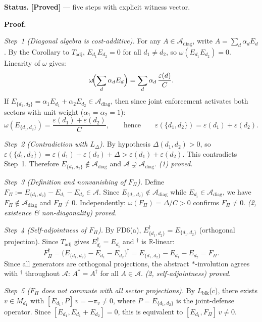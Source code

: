 \documentclass[11pt]{article}
\theoremstyle{remark}
\begin{document}
\begin{tcolorbox}[apfbox, title={Corollary of $L_\Pi$ (Joint Enforcement is Not Diagonal)}]
\smallskip\noindent\textbf{Status.}  \textbf{[Proved]} --- five steps with explicit witness vector.

\smallskip\noindent\textbf{Proof.}

\textit{Step~1 (Diagonal algebra is cost-additive).}
For any $A \in \mathcal{A}_{\mathrm{diag}}$, write $A = \sum_d \alpha_d E_d$.  By the Corollary to $T_{\mathrm{adj}}$, $E_{d_1} E_{d_2} = 0$ for all $d_1 \ne d_2$, so $\omega(E_{d_1} E_{d_2}) = 0$.  Linearity of $\omega$ gives:
\[
\omega\!\Bigl(\sum_d \alpha_d E_d\Bigr) = \sum_d \alpha_d\,\frac{\varepsilon(d)}{C}.
\]
If $E_{\{d_1,d_2\}} = \alpha_1 E_{d_1} + \alpha_2 E_{d_2} \in \mathcal{A}_{\mathrm{diag}}$, then since joint enforcement activates both sectors with unit weight ($\alpha_1 = \alpha_2 = 1$):
\[
\omega(E_{\{d_1,d_2\}}) = \frac{\varepsilon(d_1)+\varepsilon(d_2)}{C},
\qquad\text{hence}\qquad
\varepsilon(\{d_1,d_2\}) = \varepsilon(d_1)+\varepsilon(d_2).
\]

\textit{Step~2 (Contradiction with $L_\Delta$).}
By hypothesis $\Delta(d_1,d_2) > 0$, so $\varepsilon(\{d_1,d_2\}) = \varepsilon(d_1)+\varepsilon(d_2)+\Delta > \varepsilon(d_1)+\varepsilon(d_2)$. This contradicts Step~1.  Therefore $E_{\{d_1,d_2\}} \notin \mathcal{A}_{\mathrm{diag}}$ and $\mathcal{A} \supsetneq \mathcal{A}_{\mathrm{diag}}$. \hfill\textit{(1) proved.}

\textit{Step~3 (Definition and nonvanishing of $F_\Pi$).}
Define $F_\Pi := E_{\{d_1,d_2\}} - E_{d_1} - E_{d_2} \in \mathcal{A}$.
Since $E_{\{d_1,d_2\}} \notin \mathcal{A}_{\mathrm{diag}}$ while $E_{d_i} \in \mathcal{A}_{\mathrm{diag}}$, we have $F_\Pi \notin \mathcal{A}_{\mathrm{diag}}$ and $F_\Pi \ne 0$.  Independently: $\omega(F_\Pi) = \Delta/C > 0$ confirms $F_\Pi \ne 0$. \hfill\textit{(2, existence \& non-diagonality) proved.}

\textit{Step~4 (Self-adjointness of $F_\Pi$).}
By FD6(a), $E_{\{d_1,d_2\}}^\dagger = E_{\{d_1,d_2\}}$ (orthogonal projection).
Since $T_{\mathrm{adj}}$ gives $E_{d_i}^\dagger = E_{d_i}$ and ${}^\dagger$ is $\mathbb{R}$-linear:
\[
F_\Pi^\dagger = \bigl(E_{\{d_1,d_2\}} - E_{d_1} - E_{d_2}\bigr)^\dagger
= E_{\{d_1,d_2\}} - E_{d_1} - E_{d_2} = F_\Pi.
\]
Since all generators are orthogonal projections, the abstract $*$-involution agrees with ${}^\dagger$ throughout $\mathcal{A}$: $A^* = A^\dagger$ for all $A \in \mathcal{A}$.
\hfill\textit{(2, self-adjointness) proved.}

\textit{Step~5 ($F_\Pi$ does not commute with all sector projections).}
By $L_{\mathrm{blk}}$(c), there exists $v \in M_{d_1}$ with $[E_{d_1}, P]\,v = -\pi_v \ne 0$, where $P = E_{\{d_1,d_2\}}$ is the joint-defense operator.  Since $[E_{d_1}, E_{d_1}+E_{d_2}] = 0$, this is equivalent to $[E_{d_1}, F_\Pi]\,v \ne 0$.


\end{tcolorbox}
\end{document}
